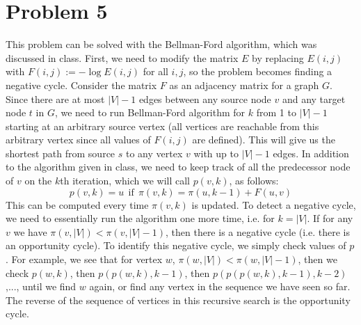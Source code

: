 \documentclass{article}
\begin{document}
\section*{Problem 5}
This problem can be solved with the Bellman-Ford algorithm, which was discussed in class. First, we need to modify the matrix $E$ by replacing $E(i,j)$ with $F(i,j):=-\log E(i,j)$ for all $i,j$, so the problem becomes finding a negative cycle. 
Consider the matrix $F$ as an adjacency matrix for a graph $G$. Since there are at most $|V|-1$ edges between any source node $v$ and any target node $t$ in $G$, we need to run Bellman-Ford algorithm for $k$ from 1 to $|V|-1$ starting at an arbitrary source vertex (all vertices are reachable from this arbitrary vertex since all values of $F(i,j)$ are defined). This will give us the shortest path from source $s$ to any vertex $v$  with up to $|V|-1$ edges.
In addition to the algorithm given in class, we need to keep track of all the predecessor node of $v$ on the $k$th iteration, which we will call $p(v,k)$, as follows:
$$p(v,k) = u \ \ \text{if} \ \ \pi(v,k)=\pi(u,k-1) + F(u,v)$$
This can be computed every time $\pi(v,k)$ is updated.
To detect a negative cycle, we need to essentially run the algorithm one more time, i.e. for $k=|V|$. If for any $v$ we have $\pi(v,|V|) < \pi(v,|V|-1)$, then there is a negative cycle (i.e. there is an opportunity cycle). To identify this negative cycle, we simply check values of $p$. For example, we see that for vertex $w$,  $\pi(w,|V|) < \pi(w,|V|-1)$, then we check $p(w,k)$, then $p(p(w,k),k-1)$, then $p(p(p(w,k),k-1),k-2)$,..., until we find $w$ again, or find any vertex in the sequence we have seen so far. The reverse of the sequence of vertices in this recursive search is the opportunity cycle.
\end{document}
